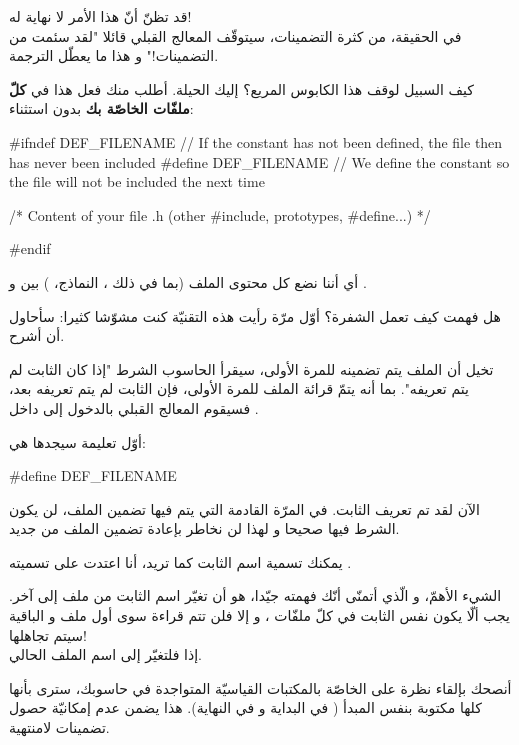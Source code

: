 قد تظنّ أنّ هذا الأمر لا نهاية له!\\
في الحقيقة، من كثرة التضمينات، سيتوقّف المعالج القبلي قائلا "لقد سئمت من التضمينات!" و هذا ما يعطّل الترجمة.

كيف السبيل لوقف هذا الكابوس المريع؟ إليك الحيلة. أطلب منك فعل هذا في
\textbf{كلّ ملفّات
الخاصّة بك} بدون استثناء:

\begin{Csource}
#ifndef DEF_FILENAME // If the constant has not been defined, the file then has never been included
#define DEF_FILENAME // We define the constant so the file will not be included the next time

/* Content of your file .h (other #include, prototypes, #define...) */

#endif
\end{Csource}

أي أننا نضع كل محتوى الملف
(بما في ذلك
،
النماذج،
)
بين 
و .

هل فهمت كيف تعمل الشفرة؟ أوّل مرّة رأيت هذه التقنيّة كنت مشوّشا كثيرا: سأحاول أن أشرح.

تخيل أن الملف
يتم تضمينه للمرة الأولى، سيقرأ الحاسوب الشرط "إذا كان الثابت
لم يتم تعريفه". بما أنه يتمّ قرائة الملف للمرة الأولى، فإن الثابت لم يتم تعريفه بعد، فسيقوم المعالج القبلي بالدخول إلى داخل
.

أوّل تعليمة سيجدها هي:

\begin{Csource}
#define DEF_FILENAME
\end{Csource}

الآن لقد تم تعريف الثابت. في المرّة القادمة التي يتم فيها تضمين الملف، لن يكون الشرط فيها صحيحا و لهذا لن نخاطر بإعادة تضمين الملف من جديد.

يمكنك تسمية اسم الثابت كما تريد، أنا اعتدت على تسميته
.

الشيء الأهمّ، و الّذي أتمنّى أنّك فهمته جيّدا، هو أن تغيّر اسم الثابت من ملف
إلى آخر. يجب ألّا يكون نفس الثابت في كلّ ملفّات
،
و إلا فلن تتم قراءة سوى أول ملف
و الباقية سيتم تجاهلها!\\
إذا فلتغيّر
إلى اسم الملف الحالي.
\begin{information}
أنصحك بإلقاء نظرة على
الخاصّة بالمكتبات القياسيّة المتواجدة في حاسوبك، سترى بأنها
كلها
مكتوبة بنفس المبدأ
(
في البداية و
في النهاية). هذا يضمن عدم إمكانيّة حصول تضمينات لامنتهية.
\end{information}

